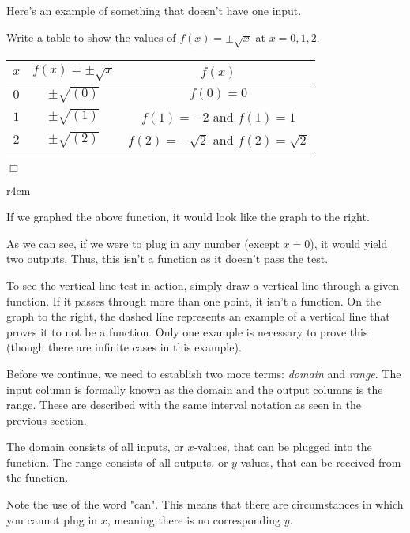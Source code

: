 \documentclass[../book.tex]{subfiles}
\begin{document}
Here's an example of something that doesn't have one input.
\begin{example}
Write a table to show the values of $f(x)=\pm\sqrt{x}$ at $x=0,1,2$.
\end{example}
\begin{solution}
\begin{center}
\begin{tabular}{ |c|c|c| } 
 \hline
 $x$ & $f(x)=\pm\sqrt{x}$ & $f(x)$ \\ 
 \hline
 $0$ & $\pm\sqrt{(0)}$ & $f(0)=0$ \\ 
 $1$ & $\pm\sqrt{(1)}$ & $f(1)=-2$ and $f(1)=1$ \\
 $2$ & $\pm\sqrt{(2)}$ & $f(2)=-\sqrt{2}$ and $f(2)=\sqrt{2}$ \\
 \hline
\end{tabular}
\end{center}$\Box$
\end{solution}
\begin{wrapfigure}{r}{4cm}
\end{wrapfigure}
If we graphed the above function, it would look like the graph to the right.

As we can see, if we were to plug in any number (except $x=0$), it would yield two outputs.  Thus, this isn't a function as it doesn't pass the test.  

To see the vertical line test in action, simply draw a vertical line through a given function.  If it passes through more than one point, it isn't a function.  On the graph to the right, the dashed line represents an example of a vertical line that proves it to not be a function.  Only one example is necessary to prove this (though there are infinite cases in this example).

Before we continue, we need to establish two more terms: \textit{domain} and \textit{range}.  The input column is formally known as the domain and the output columns is the range.  These are described with the same interval notation as seen in the \hyperlink{section.2.1}{previous} section.
\begin{note}
The domain consists of all inputs, or $x$-values, that can be plugged into the function.  The range consists of all outputs, or $y$-values, that can be received from the function.
\end{note}
Note the use of the word "can".  This means that there are circumstances in which you cannot plug in $x$, meaning there is no corresponding $y$.
\end{document}
